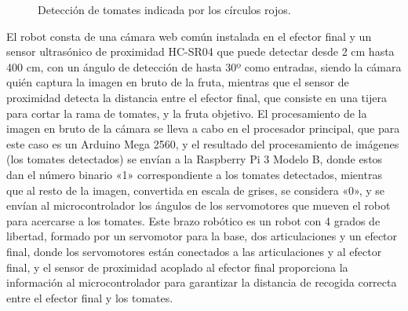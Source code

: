 \begin{figure}[h!]
    \begin{center}
      \subcapcentertrue
      \hspace{2mm}
    \end{center}
    \caption{Detección de tomates indicada por los círculos rojos.}
    \label{fig:Deteccion_tomates}
  \end{figure}

El robot consta de una cámara web común instalada en el efector final y un sensor ultrasónico de proximidad HC-SR04 que puede detectar desde 2 cm hasta 400 cm, con un ángulo de detección de hasta 30º como entradas, siendo la cámara quién captura la imagen en bruto de la fruta, mientras que el sensor de proximidad detecta la distancia entre el efector final, que consiste en una tijera para cortar la rama de tomates, y la fruta objetivo. El procesamiento de la imagen en bruto de la cámara se lleva a cabo en el procesador principal, que para este caso es un Arduino Mega 2560, y el resultado del procesamiento de imágenes (los tomates detectados) se envían a la Raspberry Pi 3 Modelo B, donde estos dan el número binario «1» correspondiente a los tomates detectados, mientras que al resto de la imagen, convertida en escala de grises, se considera «0», y se envían al microcontrolador los ángulos de los servomotores que mueven el robot para acercarse a los tomates. Este brazo robótico es un robot con 4 grados de libertad, formado por un servomotor para la base, dos articulaciones y un efector final, donde los servomotores están conectados a las articulaciones y al efector final, y el sensor de proximidad acoplado al efector final proporciona la información al microcontrolador para garantizar la distancia de recogida correcta entre el efector final y los tomates.\\

